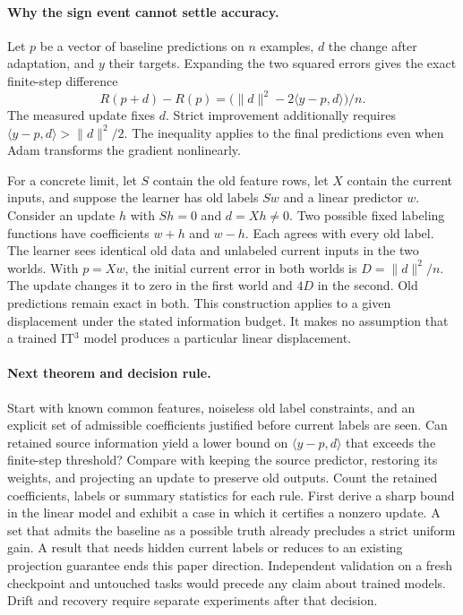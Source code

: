 \documentclass[11pt,a4paper]{article}
\begin{document}
\paragraph{Why the sign event cannot settle accuracy.}
Let $p$ be a vector of baseline predictions on $n$ examples, $d$ the
change after adaptation, and $y$ their targets. Expanding the two squared
errors gives the exact finite-step difference
\[
 R(p+d)-R(p)=\bigl(\|d\|^2-2\langle y-p,d\rangle\bigr)/n .
\]
The measured update fixes $d$. Strict improvement additionally requires
$\langle y-p,d\rangle>\|d\|^2/2$. The inequality applies to the final
predictions even when Adam transforms the gradient nonlinearly.

For a concrete limit, let $S$ contain the old feature rows, let $X$ contain
the current inputs, and suppose the learner has old labels $Sw$ and a
linear predictor $w$. Consider an update $h$ with $Sh=0$ and $d=Xh\ne0$.
Two possible fixed labeling functions have coefficients $w+h$ and $w-h$.
Each agrees with every old label. The learner sees identical old data and
unlabeled current inputs in the two worlds. With $p=Xw$, the initial
current error in both worlds is $D=\|d\|^2/n$. The update changes it to
zero in the first world and $4D$ in the second. Old predictions remain
exact in both. This construction applies to a given displacement under
the stated information budget. It makes no assumption that a trained
IT$^3$ model produces a particular linear displacement.

\paragraph{Next theorem and decision rule.}
Start with known common features, noiseless old label constraints, and an
explicit set of admissible coefficients justified before current labels
are seen. Can retained source information yield a lower bound on
$\langle y-p,d\rangle$ that exceeds the finite-step threshold? Compare
with keeping the source predictor, restoring its weights, and projecting
an update to preserve old outputs. Count the retained coefficients,
labels or summary statistics for each rule. First derive a sharp bound
in the linear model and exhibit a case in which it certifies a nonzero
update. A set that admits the baseline as a possible truth already
precludes a strict uniform gain. A result that needs hidden current
labels or reduces to an existing projection guarantee ends this paper
direction. Independent validation on a fresh checkpoint and untouched
tasks would precede any claim about trained models. Drift and recovery
require separate experiments after that decision.
\end{document}
